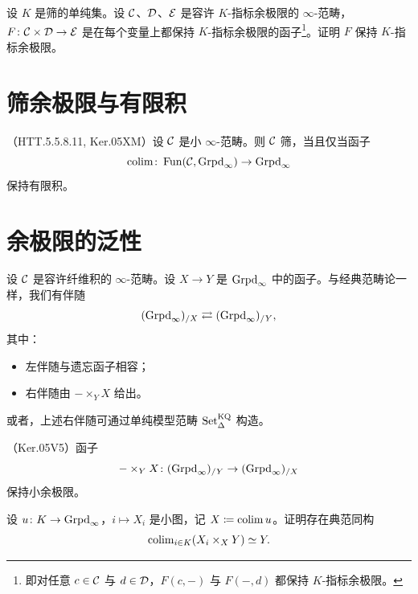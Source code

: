 \begin{exercise}\label{L10-4.13}
设 $K$ 是筛的单纯集。设 $\mathcal{C}$、$\mathcal{D}$、$\mathcal{E}$ 是容许 $K$-指标余极限的 $\infty$-范畴，$F\colon\mathcal{C}\times\mathcal{D}\to\mathcal{E}$ 是在每个变量上都保持 $K$-指标余极限的函子\footnote{即对任意 $c\in\mathcal{C}$ 与 $d\in\mathcal{D}$，$F(c,-)$ 与 $F(-,d)$ 都保持 $K$-指标余极限。}。证明 $F$ 保持 $K$-指标余极限。
\end{exercise}

\section{筛余极限与有限积}

\begin{theorem}\label{L10-5.1}
（HTT.5.5.8.11, Ker.05XM）设 $\mathcal{C}$ 是小 $\infty$-范畴。则 $\mathcal{C}$ 筛，当且仅当函子
\[
\operatorname{colim}\colon\operatorname{Fun}(\mathcal{C},\operatorname{Grpd}_\infty)\to\operatorname{Grpd}_\infty
\]
保持有限积。
\end{theorem}

\section{余极限的泛性}

\begin{construction}\label{L10-6.1}
设 $\mathcal{C}$ 是容许纤维积的 $\infty$-范畴。设 $X\to Y$ 是 $\operatorname{Grpd}_\infty$ 中的函子。与经典范畴论一样，我们有伴随
\begin{equation}\label{L10-6.1eq}
(\operatorname{Grpd}_\infty)_{/X}\rightleftarrows(\operatorname{Grpd}_\infty)_{/Y},
\end{equation}
其中：
\begin{itemize}[leftmargin=2.2em,itemsep=0.1em]
\item 左伴随与遗忘函子相容；
\item 右伴随由 $-\times_Y X$ 给出。
\end{itemize}
\end{construction}

\begin{remark}\label{L10-6.2}
或者，上述右伴随可通过单纯模型范畴 $\operatorname{Set}^{\mathrm{KQ}}_\Delta$ 构造。
\end{remark}

\begin{theorem}\label{L10-6.3}
（Ker.05V5）函子
\[
-\times_Y X\colon(\operatorname{Grpd}_\infty)_{/Y}\to(\operatorname{Grpd}_\infty)_{/X}
\]
保持小余极限。
\end{theorem}

\begin{exercise}\label{L10-6.4}
设 $u\colon K\to\operatorname{Grpd}_\infty$，$i\mapsto X_i$ 是小图，记 $X\coloneqq\operatorname{colim} u$。证明存在典范同构
\[
\operatorname{colim}_{i\in K}(X_i\times_X Y)\simeq Y.
\]
\end{exercise}

